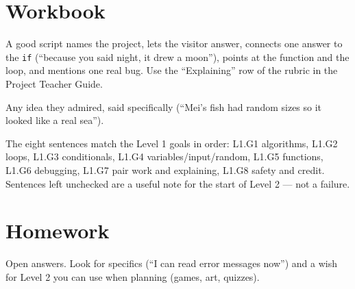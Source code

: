 
\section{Workbook}
\begin{answer}
A good script names the project, lets the visitor answer, connects one answer to the \texttt{if} (\enquote{because you said night, it drew a moon}), points at the function and the loop, and mentions one real bug. Use the \enquote{Explaining} row of the rubric in the Project Teacher Guide.
\end{answer}

\begin{answer}
Any idea they admired, said specifically (\enquote{Mei's fish had random sizes so it looked like a real sea}).
\end{answer}

\begin{answer}
The eight sentences match the Level 1 goals in order: L1.G1 algorithms, L1.G2 loops, L1.G3 conditionals, L1.G4 variables/input/random, L1.G5 functions, L1.G6 debugging, L1.G7 pair work and explaining, L1.G8 safety and credit. Sentences left unchecked are a useful note for the start of Level 2 --- not a failure.
\end{answer}

\section{Homework}
\begin{answer}
Open answers. Look for specifics (\enquote{I can read error messages now}) and a wish for Level 2 you can use when planning (games, art, quizzes).
\end{answer}

